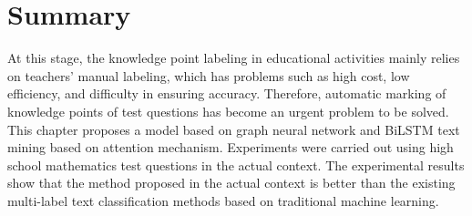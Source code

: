 \section{Summary}
At this stage, the knowledge point labeling in educational activities mainly relies on teachers' manual labeling, which has problems such as high cost, low efficiency, and difficulty in ensuring accuracy. Therefore, automatic marking of knowledge points of test questions has become an urgent problem to be solved. This chapter proposes a model based on graph neural network and BiLSTM text mining based on attention mechanism. Experiments were carried out using high school mathematics test questions in the actual context. The experimental results show that the method proposed in the actual context is better than the existing multi-label text classification methods based on traditional machine learning.





